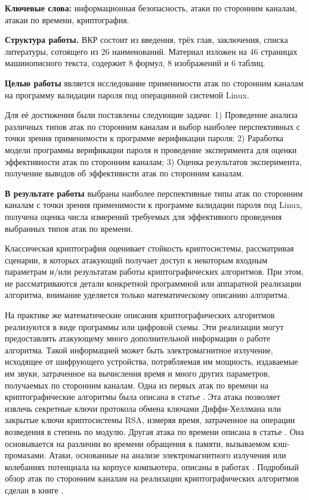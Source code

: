 
\textbf{Ключевые слова:} информационная безопасность, атаки по сторонним каналам,
атакаи по времени, криптография.

\textbf{Структура работы.} ВКР состоит из введения, трёх глав, заключения, списка
литературы, сотоящего из 26 наименований. Материал изложен на 46 страницах
машинописного текста, содержит 8 формул, 8 изображений и 6 таблиц.

\textbf{Целью работы} является исследование применимости атак по сторонним
каналам на программу валидации пароля под операцинной системой Linux.

Для её достижения были поставлены следующие задачи: 1) Проведение анализа
различных типов атак по сторонним каналам и выбор наиболее перспективных
с точки зрения применимости к программе верификации пароля; 2) Раработка
модели программы верификации пароля и проведение эксперимента для оценки
эффективности атак по сторонним каналам; 3) Оценка результатов эксперимента,
получение выводов об эффективнсти атак по сторонним каналам.

\textbf{В результате работы} выбраны наиболее перспективные типы атак по
сторонним каналам с точки зрения применимости к программе валидации пароля
под Linux, получена оценка числа измерений требуемых для эффективного проведения
выбранных типов атак по времени.

\clearpage


Классическая криптография оценивает стойкость криптосистемы, рассматривая
сценарии, в которых атакующий получает доступ к некоторым входным параметрам
и/или результатам работы криптографических алгоритмов. При этом, не
рассматриваются детали конкретной программной или аппаратной реализации
алгоритма, внимание уделяется только математическому описанию алгоритма.

На практике же математические описания криптографических алгоритмов реализуются
в виде программы или цифровой схемы. Эти реализации могут предоставлять
атакующему много дополнительной информации о работе алгоритма. Такой информацией
может быть электромагнитное излучение, исходящее от шифрующего устройства,
потрябляемая им мощность, издаваемые им звуки, затраченное на вычисления время и
много других параметров, получаемых по сторонним каналам. Одна из первых атак по
времени на криптографические алгоритмы была описана в статье \cite{kocher}. Эта
атака позволяет извлечь секретные ключи протокола обмена ключами Диффи-Хеллмана
или закрытые ключи криптосистемы RSA, измеряя время, затраченное на операции
возведения в степень по модулю. Другая атака по времени описана в статье
\cite{bernstein}. Она основывается на различии во времени обращения к памяти,
вызываемом кэш-промахами. Атаки, основанные на анализе электромагнитного
излучения или колебаниях потенциала на корпусе компьютера, описаны в работах
\cite{hands} \cite{em}. Подробный обзор атак по сторонним каналам на реализации
криптографических алгоритмов сделан в книге \cite{cren}.

